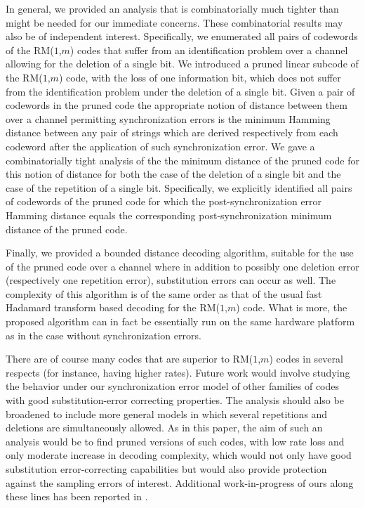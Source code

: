 {In general, we provided an analysis that is combinatorially much
tighter than might be needed for our immediate concerns. These
combinatorial results may also be of independent interest.
Specifically, we  enumerated all pairs of codewords of the
RM($1$,$m$) codes that suffer from an identification problem over
a channel allowing for the deletion of a single bit. We introduced
a pruned linear subcode of the RM($1$,$m$) code, with the loss of
one information bit, which does not suffer from the identification
problem under the deletion of a single bit. Given a pair of
codewords in the pruned code the appropriate notion of distance
between them over a channel permitting synchronization errors is
the minimum Hamming distance between any pair of strings which are
derived respectively from each codeword after the application of
such synchronization error. We gave a combinatorially tight
analysis of the the minimum distance of the pruned code for this
notion of distance for both the case of the deletion of a single
bit and the case of the repetition of a single bit. Specifically,
we explicitly identified all pairs of codewords of the pruned code
for which the post-synchronization error Hamming distance equals
the corresponding post-synchronization minimum distance of the
pruned code.

Finally, we provided a bounded distance decoding algorithm,
suitable for the use of the pruned code over a channel where in
addition to possibly one deletion error (respectively one
repetition error), substitution errors can occur as well. The
complexity of this algorithm is of the same order as that of the
usual fast Hadamard transform based decoding for the RM($1$,$m$)
code. What is more, the proposed algorithm can in fact be
essentially run on the same hardware platform as in the case
without synchronization errors.

There are of course many codes that are superior to RM($1$,$m$)
codes in several respects (for instance, having higher rates).
Future work would involve studying the behavior under our
synchronization error model of other families of codes with good
substitution-error correcting properties. The analysis should also
be broadened to include more general models in which several
repetitions and deletions are simultaneously allowed. As in this
paper, the aim of such an analysis would be to find pruned
versions of such codes, with low rate loss and only moderate
increase in decoding complexity, which would not only have good
substitution error-correcting capabilities but would also provide
protection against the sampling errors of interest. Additional
work-in-progress of ours along these lines has been reported in
\cite{daArrayTech:06}. }
